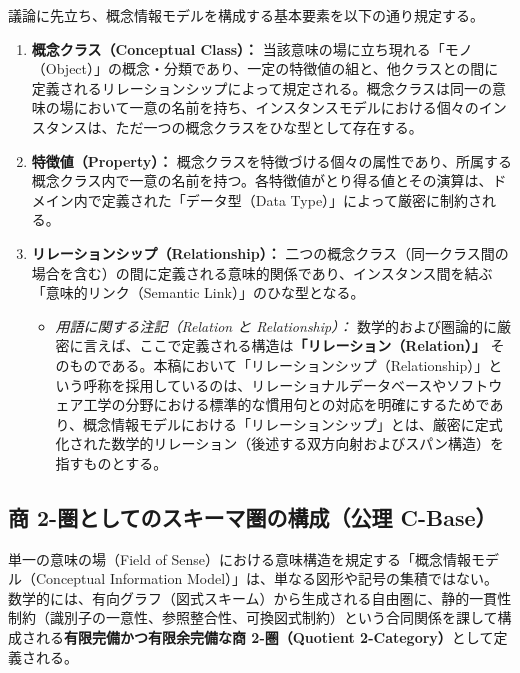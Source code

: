 \documentclass[11pt,a4paper]{ltjsarticle}
\theoremstyle{definition}
\theoremstyle{plain}
\theoremstyle{remark}
\begin{document}
議論に先立ち、概念情報モデルを構成する基本要素を以下の通り規定する。
\begin{enumerate}
    \item \textbf{概念クラス（Conceptual Class）：} 当該意味の場に立ち現れる「モノ（Object）」の概念・分類であり、一定の特徴値の組と、他クラスとの間に定義されるリレーションシップによって規定される。概念クラスは同一の意味の場において一意の名前を持ち、インスタンスモデルにおける個々のインスタンスは、ただ一つの概念クラスをひな型として存在する。
    \item \textbf{特徴値（Property）：} 概念クラスを特徴づける個々の属性であり、所属する概念クラス内で一意の名前を持つ。各特徴値がとり得る値とその演算は、ドメイン内で定義された「データ型（Data Type）」によって厳密に制約される。
    \item \textbf{リレーションシップ（Relationship）：} 二つの概念クラス（同一クラス間の場合を含む）の間に定義される意味的関係であり、インスタンス間を結ぶ「意味的リンク（Semantic Link）」のひな型となる。
    \begin{itemize}
        \item \emph{用語に関する注記（Relation と Relationship）：} 数学的および圏論的に厳密に言えば、ここで定義される構造は\textbf{「リレーション（Relation）」}\cite{codd1970} そのものである。本稿において「リレーションシップ（Relationship）」という呼称を採用しているのは、リレーショナルデータベースやソフトウェア工学の分野における標準的な慣用句との対応を明確にするためであり、概念情報モデルにおける「リレーションシップ」とは、厳密に定式化された数学的リレーション（後述する双方向射およびスパン構造）を指すものとする。
    \end{itemize}
\end{enumerate}

\subsection{商 2-圏としてのスキーマ圏の構成（公理 C-Base）}
単一の意味の場（Field of Sense）における意味構造を規定する「概念情報モデル（Conceptual Information Model）」は、単なる図形や記号の集積ではない。数学的には、有向グラフ（図式スキーム）から生成される自由圏に、静的一貫性制約（識別子の一意性、参照整合性、可換図式制約）という合同関係を課して構成される\textbf{有限完備かつ有限余完備な商 2-圏（Quotient 2-Category）}として定義される。
\end{document}
